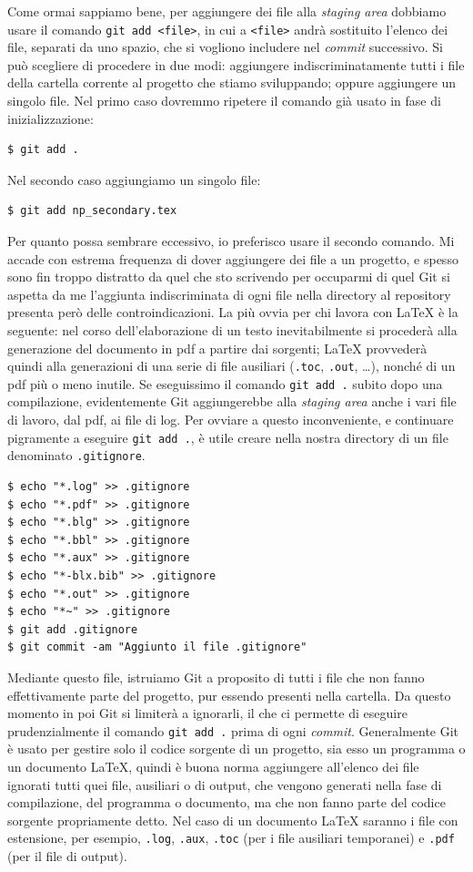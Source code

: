 \documentclass[a4paper,12pt,oneside]{article}
\begin{document}
Come ormai sappiamo bene, per aggiungere dei file alla \emph{staging area}
dobbiamo usare il comando \lstinline|git add <file>|, in cui a
\lstinline|<file>| andrà sostituito l'elenco dei file, separati da uno spazio,
che si vogliono includere nel \emph{commit} successivo. Si può scegliere di
procedere in due modi: aggiungere indiscriminatamente tutti i file della
cartella corrente al progetto che stiamo sviluppando; oppure aggiungere un
singolo file. Nel primo caso dovremmo ripetere il comando già usato in fase di
inizializzazione:
\begin{lstlisting}
$ git add .
\end{lstlisting}
Nel secondo caso aggiungiamo un singolo file:
\begin{lstlisting}
$ git add np_secondary.tex
\end{lstlisting}
Per quanto possa sembrare eccessivo, io preferisco usare il secondo comando. Mi
accade con estrema frequenza di dover aggiungere dei file a un progetto, e
spesso sono fin troppo distratto da quel che sto scrivendo per occuparmi di quel
Git si aspetta da me l'aggiunta indiscriminata di ogni file nella directory al
repository presenta però delle controindicazioni. La più ovvia per chi lavora
con \LaTeX{} è la seguente: nel corso dell'elaborazione di un testo
inevitabilmente si procederà alla generazione del documento in pdf a partire dai
sorgenti; \LaTeX{} provvederà quindi alla generazioni di una serie di file
ausiliari (\lstinline|.toc|, \lstinline|.out|, \dots), nonché di un pdf più o
meno inutile. Se eseguissimo il comando \lstinline|git add .| subito dopo una
compilazione, evidentemente Git aggiungerebbe alla \emph{staging area} anche i
vari file di lavoro, dal pdf, ai file di log. Per ovviare a questo
inconveniente, e continuare pigramente a eseguire \lstinline|git add .|, è utile
creare nella nostra directory di un file denominato \lstinline|.gitignore|.
\begin{lstlisting}
$ echo "*.log" >> .gitignore
$ echo "*.pdf" >> .gitignore
$ echo "*.blg" >> .gitignore
$ echo "*.bbl" >> .gitignore
$ echo "*.aux" >> .gitignore
$ echo "*-blx.bib" >> .gitignore
$ echo "*.out" >> .gitignore
$ echo "*~" >> .gitignore
$ git add .gitignore
$ git commit -am "Aggiunto il file .gitignore"
\end{lstlisting}

Mediante questo file, istruiamo Git a proposito di tutti i file che non fanno
effettivamente parte del progetto, pur essendo presenti nella cartella.  Da
questo momento in poi Git si limiterà a ignorarli, il che ci permette di
eseguire prudenzialmente il comando \lstinline|git add .| prima di ogni
\emph{commit}. Generalmente Git è usato per gestire solo il codice sorgente di
un progetto, sia esso un programma o un documento \LaTeX, quindi è buona norma
aggiungere all'elenco dei file ignorati tutti quei file, ausiliari o di output,
che vengono generati nella fase di compilazione, del programma o documento, ma
che non fanno parte del codice sorgente propriamente detto. Nel caso di un
documento \LaTeX{} saranno i file con estensione, per esempio, \lstinline|.log|,
\lstinline|.aux|, \lstinline|.toc| (per i file ausiliari temporanei) e
\lstinline|.pdf| (per il file di output).
\end{document}
